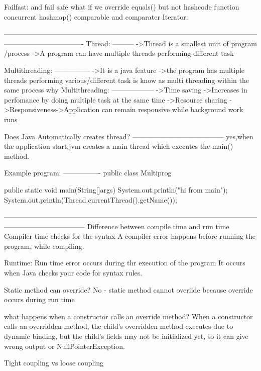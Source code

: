 {{{{{{{{Failfast: and fail safe
what if we override equals() but not hashcode function
concurrent hashmap()
comparable and comparater
Iterator:
          
----------------------------------------------------------------------------------------------------------------------------------------------
Thread:
---------
          ->Thread is a smallest unit of program /process
          ->A program can have multiple threads performing different task
          
Multithreading:
---------------
          ->It is a java feature
          ->the program has multiple threads performing various/different task is know as multi threading within the same process
why Multithreading:
------------------
          ->Time saving
          ->Increases in perfomance by doing multiple task at the same time
          ->Resource sharing
          ->Responsiveness->Application can remain responsive while background work runs

Does Java Automatically creates thread?
---------------------------------------
          yes,when the application start,jvm creates a main thread which executes the main() method.


Example program:
----------------
public class Multiprog {
	public static void main(String[]args) {
		System.out.println("hi from main");
		 System.out.println(Thread.currentThread().getName());
	}

}



-----------------------------------------------------------------------------------------------------------------------------------------------
Difference between compile time and run time
Compiler time checks for the syntax
A compiler error happens before running the program, while compiling.

Runtime:
Run time error occurs during thr execution of the program
It occurs when Java checks your code for syntax rules.


Static method can override?
No - static method cannot overiide because override occurs during run time

what happens when a constructor calls an override method?
When a constructor calls an overridden method, the child’s overridden method executes due to dynamic binding, but the child’s fields may not be initialized yet, so it can give wrong output or NullPointerException.

Tight coupling vs loose coupling

}}}}}}}}
